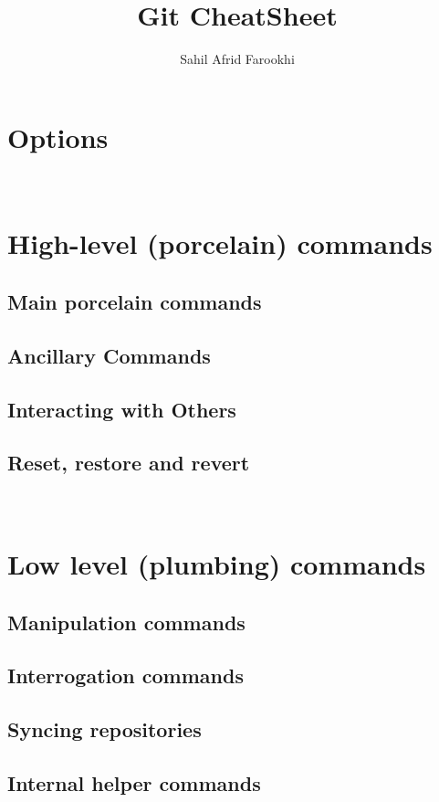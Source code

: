 \documentclass{article}
\title{Git CheatSheet}
\author{Sahil Afrid Farookhi}
\date{}
\begin{document}
\maketitle

\section*{Options}
\
\section*{High-level (porcelain) commands}
\subsection*{Main porcelain commands}
\subsection*{Ancillary Commands}
\subsection*{Interacting with Others}
\subsection*{Reset, restore and revert}
\
\section*{Low level (plumbing) commands}
\subsection*{Manipulation commands}
\subsection*{Interrogation commands}
\subsection*{Syncing repositories}
\subsection*{Internal helper commands}
\end{document}
